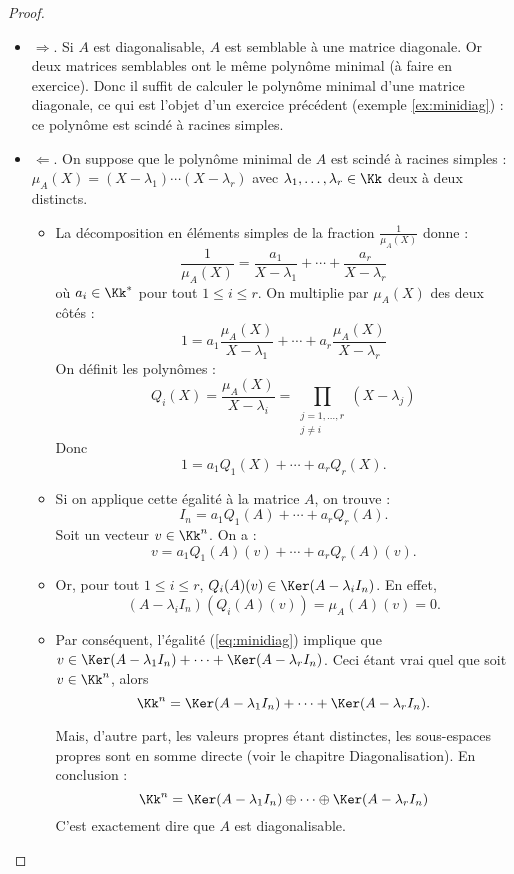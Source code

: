 \documentclass[12pt, class=report,crop=false]{standalone}
\begin{document}
\begin{proof}~

\begin{itemize}
\item $\Longrightarrow$.
Si $A$ est diagonalisable, $A$ est semblable à une matrice diagonale. Or deux matrices semblables ont le même polynôme minimal (à faire en exercice). Donc il suffit de calculer le polynôme minimal d'une matrice diagonale, ce qui est l'objet d'un exercice précédent 
(exemple \ref{ex:minidiag}) : ce polynôme est scindé à racines simples.

\item $\Longleftarrow$.
On suppose que le polynôme minimal de $A$ est scindé à racines simples :
   $\mu_A(X) = (X-\lambda_1)\cdots(X-\lambda_r)$ avec $\lambda_1,\ldots,\lambda_r\in \Kk$ deux à deux distincts.
\begin{itemize}
    \item La décomposition en éléments simples de la fraction $\frac{1}{\mu_A(X)}$ donne :
\[\frac{1}{\mu_A(X)} = \frac{a_1}{X-\lambda_1} + \cdots +\frac{a_r}{X-\lambda_r}\]
où $a_i  \in \Kk^*$ pour tout $1 \le i \le r$.
On multiplie par $\mu_A(X)$ des deux côtés :
\[1 = a_1\frac{\mu_A(X)}{X-\lambda_1} + \cdots + a_r\frac{\mu_A(X)}{X-\lambda_r}\]
On définit les polynômes :
\[Q_i(X) = \frac{\mu_A(X)}{X-\lambda_i} = \prod_{\substack{j=1,\ldots,r\\ j\neq i}}(X-\lambda_j) \]
Donc \[1  = a_1 Q_1(X) + \cdots + a_r Q_r(X).\]

    \item Si on applique cette égalité à la matrice $A$, on trouve :
\[I_n = a_1Q_1(A) +  \cdots +a_rQ_r(A).\]
Soit un vecteur $v \in \Kk^n$. On a :
\begin{equation}
\label{eq:minidiag}
v = a_1Q_1(A)(v) +\cdots+a_rQ_r(A)(v).
\end{equation}

    \item Or, pour tout $1 \le i \le r$, $Q_i(A)(v) \in \Ker (A -\lambda_iI_n)$.
    En effet,
\[(A-\lambda_iI_n)(Q_i(A)(v)) = \mu_A(A)(v) = 0 .\]
    
    \item Par conséquent, l'égalité (\ref{eq:minidiag}) implique que
    $v \in \Ker (A -\lambda_1I_n) + \cdots + \Ker (A -\lambda_rI_n)$.
    Ceci étant vrai quel que soit $v \in \Kk^n$, alors 
    $$\Kk^n = \Ker (A -\lambda_1I_n) + \cdots + \Ker (A -\lambda_rI_n).$$
    
    Mais, d'autre part, les valeurs propres étant distinctes, les sous-espaces propres sont en somme directe (voir le chapitre \og{}Diagonalisation\fg{}).
    En conclusion :    
    \[\Kk^n = \Ker (A-\lambda_1I_n)\oplus \cdots \oplus \Ker (A-\lambda_rI_n)\]
C'est exactement dire que $A$ est diagonalisable.
  \end{itemize}
\end{itemize}


\end{proof}
\end{document}
